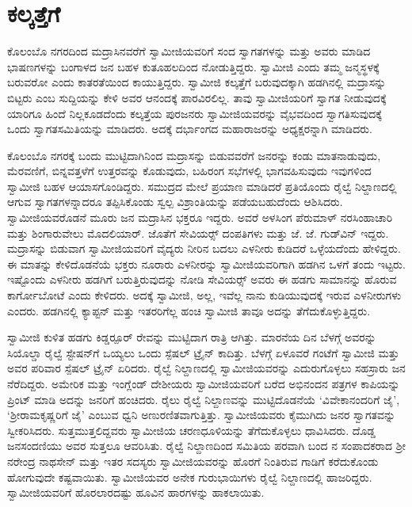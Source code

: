 
\chapter{ಕಲ್ಕತ್ತೆಗೆ}

 ಕೊಲಂಬೊ ನಗರದಿಂದ ಮದ್ರಾಸಿನವರೆಗೆ ಸ್ವಾಮೀಜಿಯವರಿಗೆ ಸಂದ ಸ್ವಾಗತಗಳನ್ನು ಮತ್ತು ಅವರು ಮಾಡಿದ ಭಾಷಣಗಳನ್ನು ಬಂಗಾಳದ ಜನ ಬಹಳ ಕುತೂಹಲದಿಂದ ನೋಡುತ್ತಿದ್ದರು. ಸ್ವಾಮೀಜಿ ಎಂದು ತಮ್ಮ ಜನ್ಮಸ್ಥಳಕ್ಕೆ ಬರುವರೋ ಎಂದು ಕಾತರತೆಯಿಂದ ಕಾಯುತ್ತಿದ್ದರು. ಸ್ವಾಮೀಜಿ ಕಲ್ಕತ್ತೆಗೆ ಬರುವುದಕ್ಕಾಗಿ ಹಡಗಿನಲ್ಲಿ ಮದ್ರಾಸನ್ನು ಬಿಟ್ಟರು ಎಂಬ ಸುದ್ದಿಯನ್ನು ಕೇಳಿ ಅವರ ಆನಂದಕ್ಕೆ ಪಾರವಿರಲಿಲ್ಲ. ತಾವು ಸ್ವಾಮೀಜಿಯರಿಗೆ ಸ್ವಾಗತ ನೀಡುವುದಕ್ಕೆ ಯಾರಿಗೂ ಹಿಂದೆ ನಿಲ್ಲಕೂಡದೆಂದು ಕಲ್ಕತ್ತೆಯ ಪುರಜನರು ಸ್ವಾಮೀಜಿಯವರನ್ನು ವೈಭವದಿಂದ ಸ್ವಾಗತಿಸುವುದಕ್ಕೆ ಒಂದು ಸ್ವಾಗತಸಮಿತಿಯನ್ನು ಮಾಡಿದರು. ಅದಕ್ಕೆ ದರ್ಭಾಂಗದ ಮಹಾರಾಜರನ್ನು ಅಧ್ಯಕ್ಷರನ್ನಾಗಿ ಮಾಡಿದರು. 

 ಕೊಲಂಬೊ ನಗರಕ್ಕೆ ಬಂದು ಮುಟ್ಟಿದಾಗಿನಿಂದ ಮದ್ರಾಸನ್ನು ಬಿಡುವವರೆಗೆ ಜನರನ್ನು ಕಂಡು ಮಾತನಾಡುವುದು, ಮೆರವಣಿಗೆ, ಬಿನ್ನವತ್ತಳೆಗೆ ಉತ್ತರವನ್ನು ಕೊಡುವುದು, ಬಹಿರಂಗ ಸಭೆಗಳಲ್ಲಿ ಭಾಗವಹಿಸುವುದು ಇವುಗಳಿಂದ ಸ್ವಾಮೀಜಿ ಬಹಳ ಆಯಾಸಗೊಂಡಿದ್ದರು. ಸಮುದ್ರದ ಮೇಲೆ ಪ್ರಯಾಣ ಮಾಡಿದರೆ ಪ್ರತಿಯೊಂದು ರೈಲ್ವೆ ನಿಲ್ದಾಣದಲ್ಲಿ ಆಗುವ ಸ್ವಾಗತಗಳನ್ನಾದರೂ ತಪ್ಪಿಸಿಕೊಂಡು ಸ್ವಲ್ಪ ವಿಶ್ರಾಂತಿಯನ್ನು ಪಡೆಯಬಹುದೆಂದು ಆಶಿಸಿದರು. ಸ್ವಾಮೀಜಿಯವರೊಡನೆ ಮೂರು ಜನ ಮದ್ರಾಸಿನ ಭಕ್ತರೂ ಇದ್ದರು. ಅವರೆ ಅಳಸಿಂಗ ಪೆರುಮಾಳ್ ನರಸಿಂಹಾಚಾರಿ ಮತ್ತು ಶಿಂಗಾರುವೇಲು ಮೊದಲಿಯಾರ್. ಜೊತೆಗೆ ಸೇವಿಯರ್ಸ್‍‍ ದಂಪತಿಗಳು ಮತ್ತು ಜೆ. ಜೆ. ಗುಡ್‍ವಿನ್ ಇದ್ದರು. ಮದ್ರಾಸನ್ನು ಬಿಡುವಾಗ ಸ್ವಾಮೀಜಿಯವರಿಗೆ ವೈದ್ಯರು ನೀರಿನ ಬದಲು ಎಳನೀರು ಕುಡಿದರೆ ಒಳ್ಳೆಯದೆಂದು ಹೇಳಿದ್ದರು. ಈ ಮಾತನ್ನು ಕೇಳಿದೊಡನೆಯೆ ಭಕ್ತರು ನೂರಾರು ಎಳನೀರನ್ನು ಸ್ವಾಮೀಜಿಯವರಿಗಾಗಿ ಹಡಗಿನ ಒಳಗೆ ತಂದು ಇಟ್ಟರು. ಇಷ್ಟೊಂದು ಎಳನೀರು ಹಡಗಿಗೆ ಬರುತ್ತಿರುವುದನ್ನು ನೋಡಿ ಸೇವಿಯರ್ಸ್‍‍ ಅವರು ಈ ಹಡಗು ಸಾಮಾನನ್ನು ಹೊರುವ ಕಾರ್ಗೋಬೋಟೆ ಎಂದು ಕೇಳಿದರು. ಅದಕ್ಕೆ ಸ್ವಾಮೀಜಿ, ಅಲ್ಲ, ಇವೆಲ್ಲ ನಾನು ಕುಡಿಯುವುದಕ್ಕೆ ಇರುವ ಎಳನೀರುಗಳು ಎಂದರು. ಹಡಗಿನಲ್ಲಿ ಕ್ಯಾಪ್ಟನ್ ಮತ್ತು ಇತರರಿಗೆಲ್ಲ ಹಂಚಿ ಸ್ವಾಮೀಜಿ ತಾವೂ ಅದನ್ನು ತೆಗೆದುಕೊಳ್ಳುತ್ತಿದ್ದರು. 

 ಸ್ವಾಮೀಜಿ ಕುಳಿತ ಹಡಗು ಕಿಡ್ಡರ್‍ಪೂರ್ ರೇವನ್ನು ಮುಟ್ಟಿದಾಗ ರಾತ್ರಿ ಆಗಿತ್ತು. ಮಾರನೆಯ ದಿನ ಬೆಳಗ್ಗೆ ಅವರನ್ನು ಸಿಯೊಲ್ಡಾ ರೈಲ್ವೆ ಸ್ಟೇಷನ್‍ಗೆ ಒಯ್ಯಲು ಒಂದು ಸ್ಪೆಷಲ್ ಟ್ರೈನ್ ಕಾದಿತ್ತು. ಬೆಳಗ್ಗೆ ಏಳೂವರೆ ಗಂಟೆಗೆ ಸ್ವಾಮೀಜಿ ಮತ್ತು ಅವರ ಪರಿವಾರ ಸ್ಪೆಷಲ್ ಟ್ರೈನ್ ಏರಿದರು. ರೈಲ್ವೆ ನಿಲ್ದಾಣದಲ್ಲಿ ಸ್ವಾಮೀಜಿಯವರನ್ನು ಎದುರುಗೊಳ್ಳಲು ಸಹಸ್ರಾರು ಜನ ನೆರೆದಿದ್ದರು. ಅಮೇರಿಕ ಮತ್ತು ಇಂಗ್ಲೆಂಡ್ ದೇಶೀಯರು ಸ್ವಾಮೀಜಿಯವರಿಗೆ ಬರೆದ ಅಭಿನಂದನ ಪತ್ರಗಳ ಕಾಪಿಯನ್ನು ಪ್ರಿಂಟ್ ಮಾಡಿ ಅದನ್ನು ಜನರಿಗೆ ಹಂಚಿದರು. ರೈಲು ರೈಲ್ವೆ ನಿಲ್ದಾಣವನ್ನು ಮುಟ್ಟಿದೊಡನೆಯೆ ‘ವಿವೇಕಾನಂದರಿಗೆ ಜೈ’, ‘ಶ‍್ರೀರಾಮಕೃಷ್ಣರಿಗೆ ಜೈ’ ಎಂಬುವ ಧ್ವನಿ ಅಣುರಣಿತವಾಗುತ್ತಿತ್ತು. ಸ್ವಾಮೀಜಿಯವರು ಕೈಮುಗಿದು ಜನರ ಸ್ವಾಗತವನ್ನು ಸ್ವೀಕರಿಸಿದರು. ಸುತ್ತಮುತ್ತಲಿದ್ದವರು ಸ್ವಾಮೀಜಿಯ ಚರಣಧೂಳಿಯನ್ನು ತೆಗೆದುಕೊಳ್ಳಲು ಧಾವಿಸಿದರು. ದೊಡ್ಡ ಜನಸಂದಣಿಯು ಅವರ ಸುತ್ತಲೂ ಆವರಿಸಿತು. ರೈಲ್ವೆ ನಿಲ್ದಾಣದಿಂದ ಸಮಿತಿಯ ಪರವಾಗಿ ಬಂದ  ನ ಸಂಪಾದಕರಾದ ಶ‍್ರೀ ನರೇಂದ್ರ ನಾಥಸೇನ್ ಮತ್ತು ಇತರ ಸದಸ್ಯರು ಸ್ವಾಮೀಜಿಯವರನ್ನು ಹೊರಗೆ ನಿಂತಿರುವ ಗಾಡಿಗೆ ಕರೆದುಕೊಂಡು ಹೋಗುವುದೇ ಕಷ್ಟವಾಯಿತು. ಸ್ವಾಮೀಜಿಯವರ ಅನೇಕ ಗುರುಭಾಯಿಗಳು ರೈಲ್ವೆ ನಿಲ್ದಾಣದಲ್ಲಿ ಹಾಜರಿದ್ದರು. ಸ್ವಾಮೀಜಿಯವರಿಗೆ ಹೊರಲಾರದಷ್ಟು ಹೂವಿನ ಹಾರಗಳನ್ನು ಹಾಕಲಾಯಿತು. 


